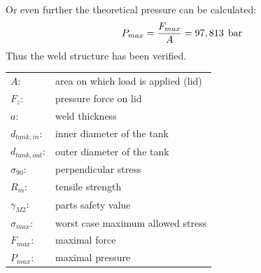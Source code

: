 Or even further the theoretical pressure can be calculated:
\begin{gather}
    P_{max} = \frac{F_{max}}{A} = 97,813 \hspace{1ex} \text{bar}
\end{gather}
Thus the weld structure has been verified.\\
\begin{tabular}{ll}
    $A$:                & area on which load is applied (lid) \\
    ${F}_{z}$:    & pressure force on lid \\
    ${a}$:    & weld thickness \\
    ${d}_{tank,in}$:    & inner diameter of the tank \\
    ${d}_{tank,out}$:    & outer diameter of the tank \\
    ${\sigma}_{90}$:    & perpendicular stress \\
    ${R}_{m}$:    & tensile strength \\
    ${\gamma}_{M2}$:    & parts safety value \\
    ${\sigma}_{max}$:    & worst case maximum allowed stress\\
    ${F}_{max}$:    & maximal force\\
    ${P}_{max}$:    & maximal pressure\\
\end{tabular}

